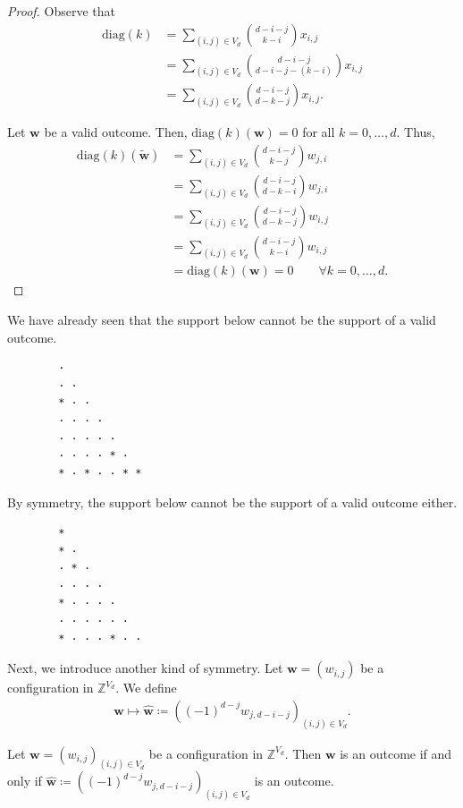 \begin{proof}
    Observe that
    \begin{align*}
        \mathrm{diag}(k)  &= \sum_{(i,j) \in V_d}\binom{d - i - j}{k-i} x_{i,j}\\ 
        &= \sum_{(i,j) \in V_d}\binom{d - i - j}{d-i-j-(k-i)} x_{i,j}\\
        &= \sum_{(i,j) \in V_d}\binom{d - i - j}{d-k-j} x_{i,j}.
    \end{align*}

    Let \( \mathbf{w} \) be a valid outcome. Then, \( \mathrm{diag}(k)(\mathbf{w}) = 0 \) for all \( k = 0, \dots, d \). Thus, 
    \begin{align*}
        \mathrm{diag}(k)(\tilde{\mathbf{w}}) &= \sum_{(i,j) \in V_d}\binom{d - i - j}{k-j} w_{j,i} \\
        &= \sum_{(i,j) \in V_d}\binom{d - i - j}{d-k-i} w_{j,i}\\
        &= \sum_{(i,j) \in V_d}\binom{d - i - j}{d-k-j} w_{i,j} \\
        &= \sum_{(i,j) \in V_d}\binom{d - i - j}{k-i} w_{i,j} \\
        &= \mathrm{diag}(k)(\mathbf w) = 0 \qquad \forall k = 0, \dots, d.
    \end{align*}
\end{proof}

\begin{example}
    We have already seen that the support below cannot be the support of a valid outcome.
    \begin{verbatim}
        · 
        · · 
        * · · 
        · · · · 
        · · · · · 
        · · · · * · 
        * · * · · * *
    \end{verbatim}
    By symmetry, the support below cannot be the support of a valid outcome either.
    \begin{verbatim}
        * 
        * · 
        · * · 
        · · · · 
        * · · · · 
        · · · · · · 
        * · · · * · ·
    \end{verbatim}
\end{example}

Next, we introduce another kind of symmetry. Let \( \mathbf{w} = (w_{i,j}) \) be a configuration in \( \mathbb{Z}^{V_d} \). We define 
\begin{align*}
    \mathbf w \mapsto \hat{\mathbf w} \coloneqq \left( (-1)^{d-j} w_{j, d - i -j} \right)_{(i,j) \in V_d}.
\end{align*}

\begin{proposition}\label{prop:symmetry-2}
    Let \( \mathbf{w} = (w_{i,j})_{(i,j) \in V_d} \) be a configuration in \( \mathbb{Z}^{V_d} \). Then \( \mathbf{w} \) is an outcome if and only if \( \hat{\mathbf w} \coloneqq \left( (-1)^{d-j} w_{j, d - i -j} \right)_{(i,j) \in V_d} \) is an outcome.
\end{proposition}

